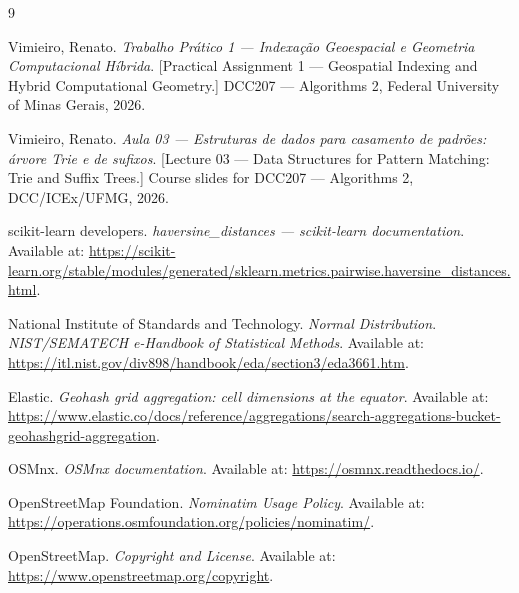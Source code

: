 \documentclass[12pt,a4paper]{article}
\begin{document}
\begin{thebibliography}{9}

Vimieiro, Renato.
\emph{Trabalho Prático 1 --- Indexação Geoespacial e Geometria Computacional Híbrida}.
[Practical Assignment 1 --- Geospatial Indexing and Hybrid Computational
Geometry.]
DCC207 --- Algorithms 2, Federal University of Minas Gerais, 2026.

Vimieiro, Renato.
\emph{Aula 03 --- Estruturas de dados para casamento de padrões: árvore Trie e de sufixos}.
[Lecture 03 --- Data Structures for Pattern Matching: Trie and Suffix Trees.]
Course slides for DCC207 --- Algorithms 2, DCC/ICEx/UFMG, 2026.

scikit-learn developers.
\emph{haversine\_distances --- scikit-learn documentation}.
Available at:
\url{https://scikit-learn.org/stable/modules/generated/sklearn.metrics.pairwise.haversine_distances.html}.

National Institute of Standards and Technology.
\emph{Normal Distribution}. \emph{NIST/SEMATECH e-Handbook of Statistical Methods}.
Available at:
\url{https://itl.nist.gov/div898/handbook/eda/section3/eda3661.htm}.

Elastic.
\emph{Geohash grid aggregation: cell dimensions at the equator}.
Available at:
\url{https://www.elastic.co/docs/reference/aggregations/search-aggregations-bucket-geohashgrid-aggregation}.

OSMnx.
\emph{OSMnx documentation}.
Available at: \url{https://osmnx.readthedocs.io/}.

OpenStreetMap Foundation.
\emph{Nominatim Usage Policy}.
Available at:
\url{https://operations.osmfoundation.org/policies/nominatim/}.

OpenStreetMap.
\emph{Copyright and License}.
Available at: \url{https://www.openstreetmap.org/copyright}.

\end{thebibliography}
\end{document}
